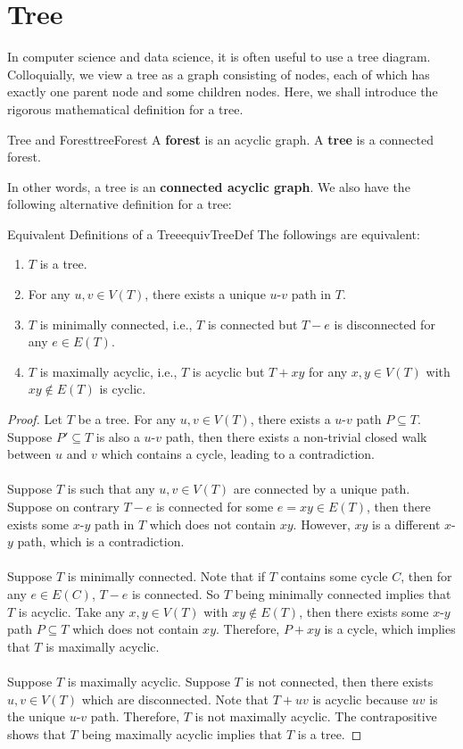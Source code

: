 \documentclass[math, code]{amznotes}
\theoremstyle{remark}
\begin{document}
\section{Tree}
In computer science and data science, it is often useful to use a tree diagram. Colloquially, we view a tree as a graph consisting of nodes, each of which has exactly one parent node and some children nodes. Here, we shall introduce the rigorous mathematical definition for a tree.
\begin{dfnbox}{Tree and Forest}{treeForest}
    A {\color{red} \textbf{forest}} is an acyclic graph. A {\color{red} \textbf{tree}} is a connected forest.
\end{dfnbox}
In other words, a tree is an \textbf{connected acyclic graph}. We also have the following alternative definition for a tree:
\begin{thmbox}{Equivalent Definitions of a Tree}{equivTreeDef}
    The followings are equivalent:
    \begin{enumerate}
        \item $T$ is a tree.
        \item For any $u, v \in V(T)$, there exists a unique $u$-$v$ path in $T$.
        \item $T$ is minimally connected, i.e., $T$ is connected but $T - e$ is disconnected for any $e \in E(T)$.
        \item $T$ is maximally acyclic, i.e., $T$ is acyclic but $T + xy$ for any $x, y \in V(T)$ with $xy \notin E(T)$ is cyclic.
    \end{enumerate}
    \tcblower
    \begin{proof}
        Let $T$ be a tree. For any $u, v \in V(T)$, there exists a $u$-$v$ path $P \subseteq T$. Suppose $P' \subseteq T$ is also a $u$-$v$ path, then there exists a non-trivial closed walk between $u$ and $v$ which contains a cycle, leading to a contradiction.
        \\\\
        Suppose $T$ is such that any $u, v \in V(T)$ are connected by a unique path. Suppose on contrary $T - e$ is connected for some $e = xy \in E(T)$, then there exists some $x$-$y$ path in $T$ which does not contain $xy$. However, $xy$ is a different $x$-$y$ path, which is a contradiction.
        \\\\
        Suppose $T$ is minimally connected. Note that if $T$ contains some cycle $C$, then for any $e \in E(C)$, $T - e$ is connected. So $T$ being minimally connected implies that $T$ is acyclic. Take any $x, y \in V(T)$ with $xy \notin E(T)$, then there exists some $x$-$y$ path $P \subseteq T$ which does not contain $xy$. Therefore, $P + xy$ is a cycle, which implies that $T$ is maximally acyclic.
        \\\\
        Suppose $T$ is maximally acyclic. Suppose $T$ is not connected, then there exists $u, v \in V(T)$ which are disconnected. Note that $T + uv$ is acyclic because $uv$ is the unique $u$-$v$ path. Therefore, $T$ is not maximally acyclic. The contrapositive shows that $T$ being maximally acyclic implies that $T$ is a tree.
    \end{proof}
\end{thmbox}
\end{document}
